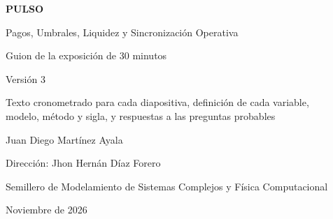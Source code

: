\documentclass[11pt,a4paper,oneside]{article}
\begin{document}
\begin{titlepage}
\centering
\vspace*{3cm}
{\sffamily\bfseries\Huge\color{azul} PULSO\par}
\vspace{0.2cm}
{\sffamily\large\color{gris} Pagos, Umbrales, Liquidez y Sincronización Operativa\par}
\vspace{0.9cm}
{\sffamily\LARGE Guion de la exposición de 30 minutos\par}
\vspace{0.3cm}
{\large Versión 3\par}
\vspace{0.6cm}
{\normalsize Texto cronometrado para cada diapositiva, definición de cada variable,\\
modelo, método y sigla, y respuestas a las preguntas probables\par}
\vfill
{\large Juan Diego Martínez Ayala\par}
{\normalsize Dirección: Jhon Hernán Díaz Forero\par}
{\normalsize Semillero de Modelamiento de Sistemas Complejos y Física Computacional\par}
\vspace{0.4cm}
{\normalsize Noviembre de 2026\par}
\end{titlepage}

\tableofcontents
\clearpage


\clearpage


\end{document}
